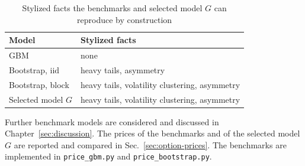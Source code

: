\begin{table}[H]
  \centering
  \begin{tabular}{ll}
    \toprule
    Model & Stylized facts \\
    \midrule
    GBM & none \\
    Bootstrap, $\mathrm{iid}$            & heavy tails, asymmetry \\
    Bootstrap, block          & heavy tails, volatility clustering, asymmetry \\
    Selected model $G$        & heavy tails, volatility clustering, asymmetry \\
    \bottomrule
  \end{tabular}
  \caption[Stylized facts by construction]{Stylized facts the benchmarks and selected model $G$ can reproduce by construction}
  \label{tab:benchmark-properties}
\end{table}

Further benchmark models are considered and discussed in Chapter~\ref{sec:discussion}. The prices of the benchmarks and of the selected model $G$ are reported and compared in Sec.~\ref{sec:option-prices}. The benchmarks are implemented in \texttt{price\_gbm.py} and \texttt{price\_bootstrap.py}.
